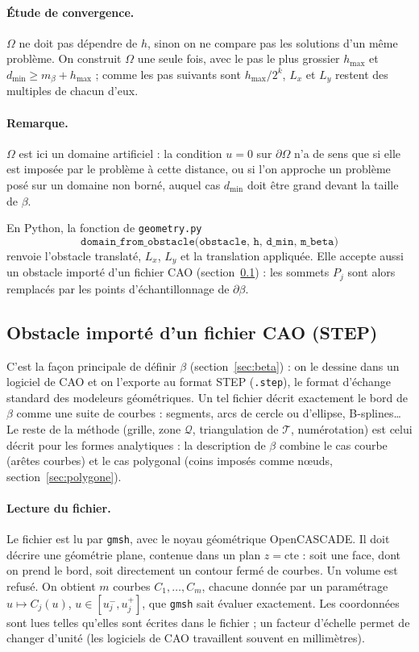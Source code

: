 \documentclass[11pt,a4paper]{article}
\begin{document}
\paragraph{Étude de convergence.} $\Omega$ ne doit pas dépendre de $h$, sinon
on ne compare pas les solutions d'un même problème. On construit $\Omega$ une
seule fois, avec le pas le plus grossier $h_{\max}$ et
$d_{\min} \ge m_\beta + h_{\max}$ ; comme les pas suivants sont
$h_{\max}/2^k$, $L_x$ et $L_y$ restent des multiples de chacun d'eux.

\paragraph{Remarque.} $\Omega$ est ici un domaine artificiel : la condition
$u = 0$ sur $\partial\Omega$ n'a de sens que si elle est imposée par le
problème à cette distance, ou si l'on approche un problème posé sur un
domaine non borné, auquel cas $d_{\min}$ doit être grand devant la taille de
$\beta$.

En Python, la fonction de \texttt{geometry.py}
\[
\texttt{domain\_from\_obstacle(obstacle, h, d\_min, m\_beta)}
\]
renvoie l'obstacle translaté, $L_x$, $L_y$ et la translation appliquée. Elle
accepte aussi un obstacle importé d'un fichier CAO
(section~\ref{sec:step}) : les sommets $P_j$ sont alors remplacés par les
points d'échantillonnage de $\partial\beta$.

\subsection{Obstacle importé d'un fichier CAO (STEP)}
\label{sec:step}

C'est la façon principale de définir $\beta$ (section~\ref{sec:beta}) : on
le dessine dans un logiciel de CAO et on l'exporte au format STEP
(\texttt{.step}), le format d'échange standard des modeleurs géométriques. Un tel fichier décrit exactement le bord de $\beta$ comme une
suite de courbes : segments, arcs de cercle ou d'ellipse, B-splines\dots{} Le
reste de la méthode (grille, zone $\mathcal{Q}$, triangulation de
$\mathcal{T}$, numérotation) est celui décrit pour les formes analytiques :
la description de $\beta$ combine le cas courbe (arêtes courbes) et le cas
polygonal (coins imposés comme nœuds, section~\ref{sec:polygone}).

\paragraph{Lecture du fichier.} Le fichier est lu par \texttt{gmsh}, avec le
noyau géométrique OpenCASCADE. Il doit décrire une géométrie plane, contenue
dans un plan $z = \text{cte}$ : soit une face, dont on prend le bord, soit
directement un contour fermé de courbes. Un volume est refusé. On obtient $m$
courbes $C_1, \dots, C_m$, chacune donnée par un paramétrage
$u \mapsto C_j(u)$, $u \in [u_j^-, u_j^+]$, que \texttt{gmsh} sait évaluer
exactement. Les coordonnées sont lues telles qu'elles sont écrites dans le
fichier ; un facteur d'échelle permet de changer d'unité (les logiciels de CAO
travaillent souvent en millimètres).
\end{document}
